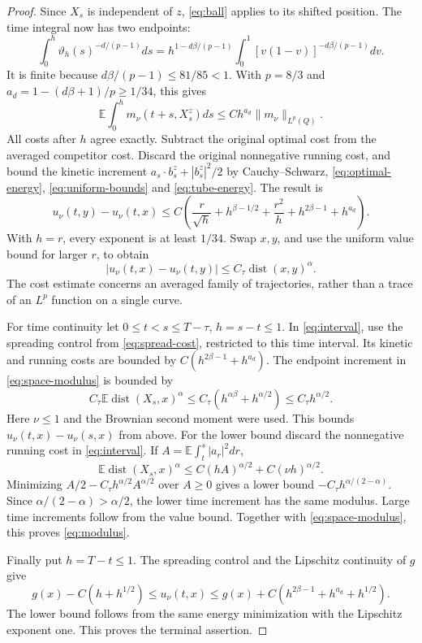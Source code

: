 \documentclass[11pt]{article}
\numberwithin{equation}{section}
\begin{document}
\begin{proof}
Since \(X_s\) is independent of \(z\), \eqref{eq:ball} applies to its
shifted position. The time integral now has two endpoints:
\[
 \int_0^h\vartheta_h(s)^{-d/(p-1)}ds
 =h^{1-d\beta/(p-1)}
   \int_0^1[v(1-v)]^{-d\beta/(p-1)}dv .
\]
It is finite because \(d\beta/(p-1)\le81/85<1\). With
\(p=8/3\) and \(a_d=1-(d\beta+1)/p\ge1/34\), this gives
\[
 \mathbb E\int_0^h m_\nu(t+s,X_s^z)ds
           \le C h^{a_d}\|m_\nu\|_{L^p(Q)} .
\]
All costs after \(h\) agree exactly. Subtract the original optimal
cost from the averaged competitor cost. Discard the original
nonnegative running cost, and bound the kinetic increment
\(a_s\cdot b_s^z+|b_s^z|^2/2\) by Cauchy--Schwarz,
\eqref{eq:optimal-energy}, \eqref{eq:uniform-bounds} and
\eqref{eq:tube-energy}. The result is
\[
 u_\nu(t,y)-u_\nu(t,x)
 \le C\left(\frac r{\sqrt h}+h^{\beta-1/2}
             +\frac{r^2}{h}+h^{2\beta-1}+h^{a_d}\right).
\]
With \(h=r\), every exponent is at least \(1/34\).
Swap \(x,y\), and use the uniform value bound for larger \(r\), to obtain
\begin{equation}\label{eq:space-modulus}
 |u_\nu(t,x)-u_\nu(t,y)|
       \le C_\tau\operatorname{dist}(x,y)^\alpha .
\end{equation}
The cost estimate concerns an averaged family of trajectories, rather
than a trace of an \(L^p\) function on a single curve.

For time continuity let \(0\le t<s\le T-\tau\), \(h=s-t\le1\).
In \eqref{eq:interval}, use the spreading control from
\eqref{eq:spread-cost}, restricted to this time interval.
Its kinetic and running costs are bounded by
\(C(h^{2\beta-1}+h^{a_d})\). The endpoint increment in
\eqref{eq:space-modulus} is bounded by
\[
 C_\tau\mathbb E\operatorname{dist}(X_s,x)^\alpha
 \le C_\tau(h^{\alpha\beta}+h^{\alpha/2})
 \le C_\tau h^{\alpha/2}.
\]
Here \(\nu\le1\) and the Brownian second moment were used.
This bounds \(u_\nu(t,x)-u_\nu(s,x)\) from above.
For the lower bound discard the nonnegative running cost in
\eqref{eq:interval}. If \(A=\mathbb E\int_t^s|a_r|^2dr\),
\[
 \mathbb E\operatorname{dist}(X_s,x)^\alpha
       \le C(hA)^{\alpha/2}+C(\nu h)^{\alpha/2}.
\]
Minimizing \(A/2-C_\tau h^{\alpha/2}A^{\alpha/2}\) over \(A\ge0\)
gives a lower bound \(-C_\tau h^{\alpha/(2-\alpha)}\).
Since \(\alpha/(2-\alpha)>\alpha/2\), the lower time increment
has the same modulus. Large time increments follow from the value
bound. Together with \eqref{eq:space-modulus}, this proves
\eqref{eq:modulus}.

Finally put \(h=T-t\le1\). The spreading control and the Lipschitz
continuity of \(g\) give
\begin{equation}\label{eq:terminal}
 g(x)-C(h+h^{1/2})\le u_\nu(t,x)
       \le g(x)+C(h^{2\beta-1}+h^{a_d}+h^{1/2}).
\end{equation}
The lower bound follows from the same energy minimization with the
Lipschitz exponent one. This proves the terminal assertion.
\end{proof}
\end{document}

